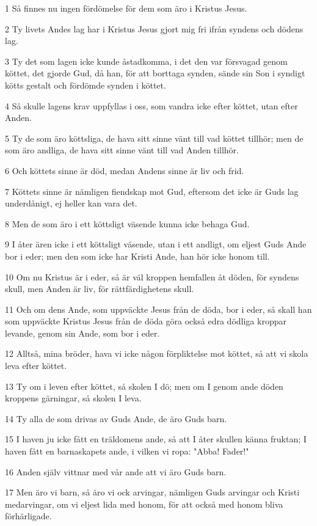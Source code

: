 \par 1 Så finnes nu ingen fördömelse för dem som äro i Kristus Jesus.
\par 2 Ty livets Andes lag har i Kristus Jesus gjort mig fri ifrån syndens och dödens lag.
\par 3 Ty det som lagen icke kunde åstadkomma, i det den var försvagad genom köttet, det gjorde Gud, då han, för att borttaga synden, sände sin Son i syndigt kötts gestalt och fördömde synden i köttet.
\par 4 Så skulle lagens krav uppfyllas i oss, som vandra icke efter köttet, utan efter Anden.
\par 5 Ty de som äro köttsliga, de hava sitt sinne vänt till vad köttet tillhör; men de som äro andliga, de hava sitt sinne vänt till vad Anden tillhör.
\par 6 Och köttets sinne är död, medan Andens sinne är liv och frid.
\par 7 Köttets sinne är nämligen fiendskap mot Gud, eftersom det icke är Guds lag underdånigt, ej heller kan vara det.
\par 8 Men de som äro i ett köttsligt väsende kunna icke behaga Gud.
\par 9 I åter ären icke i ett köttsligt väsende, utan i ett andligt, om eljest Guds Ande bor i eder; men den som icke har Kristi Ande, han hör icke honom till.
\par 10 Om nu Kristus är i eder, så är väl kroppen hemfallen åt döden, för syndens skull, men Anden är liv, för rättfärdighetens skull.
\par 11 Och om dens Ande, som uppväckte Jesus från de döda, bor i eder, så skall han som uppväckte Kristus Jesus från de döda göra också edra dödliga kroppar levande, genom sin Ande, som bor i eder.
\par 12 Alltså, mina bröder, hava vi icke någon förpliktelse mot köttet, så att vi skola leva efter köttet.
\par 13 Ty om i leven efter köttet, så skolen I dö; men om I genom ande döden kroppens gärningar, så skolen I leva.
\par 14 Ty alla de som drivas av Guds Ande, de äro Guds barn.
\par 15 I haven ju icke fått en träldomens ande, så att I åter skullen känna fruktan; I haven fått en barnaskapets ande, i vilken vi ropa: "Abba! Fader!"
\par 16 Anden själv vittnar med vår ande att vi äro Guds barn.
\par 17 Men äro vi barn, så äro vi ock arvingar, nämligen Guds arvingar och Kristi medarvingar, om vi eljest lida med honom, för att också med honom bliva förhärligade.
